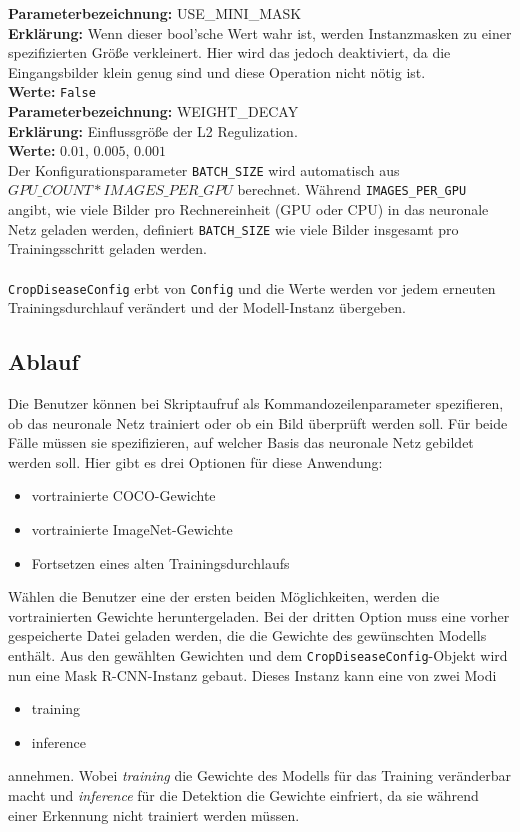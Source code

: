 \noindent
\textbf{Parameterbezeichnung:} USE\_MINI\_MASK\\
\textbf{Erklärung:} Wenn dieser bool'sche Wert wahr ist, werden Instanzmasken zu einer spezifizierten Größe verkleinert. Hier wird das jedoch deaktiviert, da die Eingangsbilder klein genug sind und diese Operation nicht nötig ist.\\
\textbf{Werte:} \texttt{False}\\

\noindent
\textbf{Parameterbezeichnung:} WEIGHT\_DECAY\\
\textbf{Erklärung:} Einflussgröße der L2 Regulization.\\
\textbf{Werte:} $0.01$, $0.005$, $0.001$\\

\noindent
Der Konfigurationsparameter \texttt{BATCH\_SIZE} wird automatisch aus $GPU\_COUNT * IMAGES\_PER\_GPU$ berechnet. Während \texttt{IMAGES\_PER\_GPU} angibt, wie viele Bilder pro Rechnereinheit (GPU oder CPU) in das neuronale Netz geladen werden, definiert \texttt{BATCH\_SIZE} wie viele Bilder insgesamt pro Trainingsschritt geladen werden.
\\\\
\texttt{CropDiseaseConfig} erbt von \texttt{Config} und die Werte werden vor jedem erneuten Trainingsdurchlauf verändert und der Modell-Instanz übergeben.  

\subsection{Ablauf}

Die Benutzer können bei Skriptaufruf als Kommandozeilenparameter spezifieren, ob das neuronale Netz trainiert oder ob ein Bild überprüft werden soll. Für beide Fälle müssen sie spezifizieren, auf welcher Basis das neuronale Netz gebildet werden soll. Hier gibt es drei Optionen für diese Anwendung:

\begin{itemize}
	\item vortrainierte COCO-Gewichte
	\item vortrainierte ImageNet-Gewichte
	\item Fortsetzen eines alten Trainingsdurchlaufs
\end{itemize}
\noindent
Wählen die Benutzer eine der ersten beiden Möglichkeiten, werden die vortrainierten Gewichte heruntergeladen. Bei der dritten Option muss eine vorher gespeicherte Datei geladen werden, die die Gewichte des gewünschten Modells enthält. Aus den gewählten Gewichten und dem \texttt{CropDiseaseConfig}-Objekt wird nun eine Mask R-CNN-Instanz gebaut. Dieses Instanz kann eine von zwei Modi 
\begin{itemize}
	\item training
	\item inference
\end{itemize}
annehmen. Wobei \textit{training} die Gewichte des Modells für das Training veränderbar macht und \textit{inference} für die Detektion die Gewichte einfriert, da sie während einer Erkennung nicht trainiert werden müssen.


